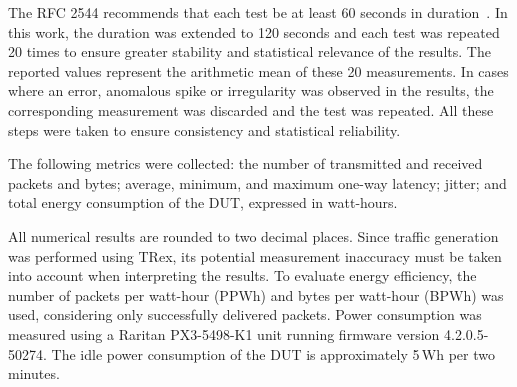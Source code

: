 The RFC 2544 recommends that each test be at least 60 seconds in duration~\cite{rfc2544}. 
In this work, the duration was extended to 120 seconds and each test was repeated 20 times to ensure greater stability and statistical relevance of the results. 
The reported values represent the arithmetic mean of these 20 measurements.
In cases where an error, anomalous spike or irregularity was observed in the results, the corresponding measurement was discarded and the test was repeated. 
All these steps were taken to ensure consistency and statistical reliability.

The following metrics were collected: the number of transmitted and received packets and bytes; average, minimum, and maximum one-way latency; jitter; 
and total energy consumption of the DUT, expressed in watt-hours.

All numerical results are rounded to two decimal places.
Since traffic generation was performed using TRex, its potential measurement inaccuracy must be taken into account when interpreting the results.
To evaluate energy efficiency, the number of packets per watt-hour (PPWh) and bytes per watt-hour (BPWh) was used, considering only successfully delivered packets.
Power consumption was measured using a Raritan PX3-5498-K1 unit running firmware version 4.2.0.5-50274.
The idle power consumption of the DUT is approximately 5 Wh per two minutes.
